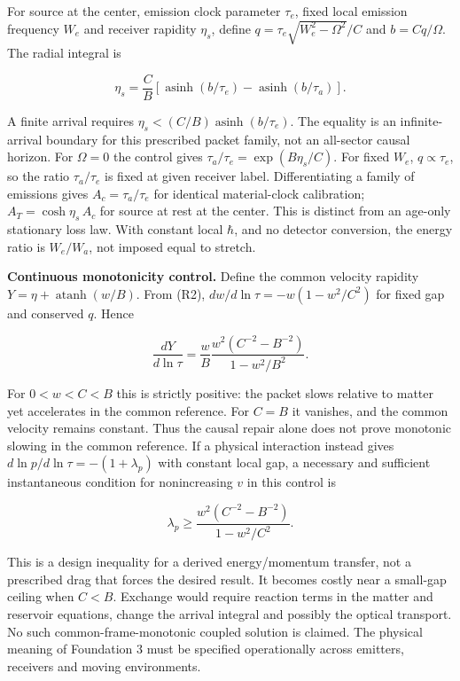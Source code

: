 \documentclass[
  11pt,
  twoside]{article}
\begin{document}
For source at the center, emission clock parameter \(\tau_e\), fixed
local emission frequency \(W_e\) and receiver rapidity \(\eta_s\),
define \(q=\tau_e\sqrt{W_e^2-\Omega^2}/C\) and \(b=Cq/\Omega\). The
radial integral is

\[\eta_s=\frac CB\left[\operatorname{asinh}(b/\tau_e)
-\operatorname{asinh}(b/\tau_a)\right].\tag{R4}\]

A finite arrival requires
\(\eta_s<(C/B)\operatorname{asinh}(b/\tau_e)\). The equality is an
infinite-arrival boundary for this prescribed packet family, not an
all-sector causal horizon. For \(\Omega=0\) the control gives
\(\tau_a/\tau_e=\exp(B\eta_s/C)\). For fixed \(W_e\),
\(q\propto\tau_e\), so the ratio \(\tau_a/\tau_e\) is fixed at given
receiver label. Differentiating a family of emissions gives
\(A_c=\tau_a/\tau_e\) for identical material-clock calibration;
\(A_T=\cosh\eta_s\,A_c\) for source at rest at the center. This is
distinct from an age-only stationary loss law. With constant local
\(\hbar\), and no detector conversion, the energy ratio is \(W_e/W_a\),
not imposed equal to stretch.

\textbf{Continuous monotonicity control.} Define the common velocity
rapidity \(Y=\eta+\operatorname{atanh}(w/B)\). From (R2),
\(dw/d\ln\tau=-w(1-w^2/C^2)\) for fixed gap and conserved \(q\). Hence

\[\frac{dY}{d\ln\tau}=\frac{w}{B}\frac{w^2(C^{-2}-B^{-2})}{1-w^2/B^2}.\tag{R5}\]

For \(0<w<C<B\) this is strictly positive: the packet slows relative to
matter yet accelerates in the common reference. For \(C=B\) it vanishes,
and the common velocity remains constant. Thus the causal repair alone
does not prove monotonic slowing in the common reference. If a physical
interaction instead gives \(d\ln p/d\ln\tau=-(1+\lambda_p)\) with
constant local gap, a necessary and sufficient instantaneous condition
for nonincreasing \(v\) in this control is

\[\lambda_p\geq\frac{w^2(C^{-2}-B^{-2})}{1-w^2/C^2}.\tag{R6}\]

This is a design inequality for a derived energy/momentum transfer, not
a prescribed drag that forces the desired result. It becomes costly near
a small-gap ceiling when \(C<B\). Exchange would require reaction terms
in the matter and reservoir equations, change the arrival integral and
possibly the optical transport. No such common-frame-monotonic coupled
solution is claimed. The physical meaning of Foundation 3 must be
specified operationally across emitters, receivers and moving
environments.
\end{document}
